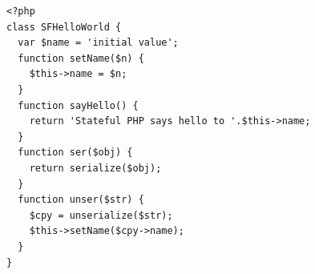 \begin{lstlisting}[caption=PHP-Implementierung]
<?php
class SFHelloWorld {
  var $name = 'initial value';
  function setName($n) {
    $this->name = $n;
  }
  function sayHello() {
    return 'Stateful PHP says hello to '.$this->name;
  }
  function ser($obj) {
    return serialize($obj);
  }
  function unser($str) {
    $cpy = unserialize($str);
    $this->setName($cpy->name);
  }
}
\end{lstlisting}


